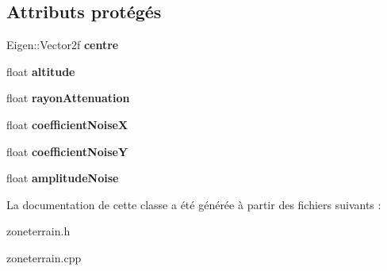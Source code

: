 \subsection*{Attributs protégés}
\begin{DoxyCompactItemize}
\item 
\hypertarget{class_zone_terrain_acce9d717490520d39c3d0c56f8ee58f8}{}Eigen\+::\+Vector2f {\bfseries centre}\label{class_zone_terrain_acce9d717490520d39c3d0c56f8ee58f8}

\item 
\hypertarget{class_zone_terrain_a8aadd657672d2073073aa25d2a64876a}{}float {\bfseries altitude}\label{class_zone_terrain_a8aadd657672d2073073aa25d2a64876a}

\item 
\hypertarget{class_zone_terrain_a588e1255fac8ba1b622666054323f472}{}float {\bfseries rayon\+Attenuation}\label{class_zone_terrain_a588e1255fac8ba1b622666054323f472}

\item 
\hypertarget{class_zone_terrain_a0ad17539d7d19b9e4d0d9bb0084a9fc9}{}float {\bfseries coefficient\+Noise\+X}\label{class_zone_terrain_a0ad17539d7d19b9e4d0d9bb0084a9fc9}

\item 
\hypertarget{class_zone_terrain_a198227fd3e4fc6bff60d9e4bb4dad02a}{}float {\bfseries coefficient\+Noise\+Y}\label{class_zone_terrain_a198227fd3e4fc6bff60d9e4bb4dad02a}

\item 
\hypertarget{class_zone_terrain_a2928633257d8ce3f5ea988705a67aad7}{}float {\bfseries amplitude\+Noise}\label{class_zone_terrain_a2928633257d8ce3f5ea988705a67aad7}

\end{DoxyCompactItemize}


La documentation de cette classe a été générée à partir des fichiers suivants \+:\begin{DoxyCompactItemize}
\item 
zoneterrain.\+h\item 
zoneterrain.\+cpp\end{DoxyCompactItemize}
